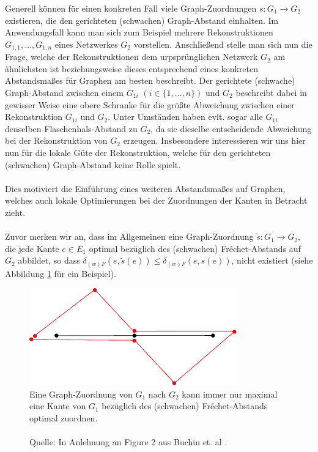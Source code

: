 \documentclass[a4paper, 12pt, twoside]{article}
\theoremstyle{Format1} %
\begin{document}
Generell können für einen konkreten Fall viele Graph-Zuordnungen $s: G_1 \to G_2$ existieren, die den gerichteten (schwachen) Graph-Abstand einhalten.
Im Anwendungsfall kann man sich zum Beispiel mehrere Rekonstruktionen $G_{1,1}, ..., G_{1,n}$ eines Netzwerkes $G_2$ vorstellen.
Anschließend stelle man sich nun die Frage, welche der Rekonstruktionen dem urpsprünglichen Netzwerk $G_2$ am ähnlichsten ist beziehungsweise dieses entsprechend eines konkreten Abstandsmaßes
für Graphen am besten beschreibt.
Der gerichtete (schwache) Graph-Abstand zwischen einem $G_{1i}$ $(i \in \{1,...,n\})$ und $G_2$ beschreibt dabei in gewisser Weise eine obere Schranke für die größte Abweichung zwischen
einer Rekonstruktion $G_{1i}$ und $G_2$.
Unter Umständen haben evlt. sogar alle $G_{1i}$ denselben Flaschenhals-Abstand zu $G_2$, da sie dieselbe entscheidende Abweichung bei der Rekonstruktion von $G_2$ erzeugen.
Insbesondere interessieren wir uns hier nun für die lokale Güte der Rekonstruktion, welche für den gerichteten (schwachen) Graph-Abstand keine Rolle spielt.
\\
\\
Dies motiviert die Einführung eines weiteren Abstandsmaßes auf Graphen, welches auch lokale Optimierungen bei der Zuordnungen der Kanten in Betracht zieht.
\\
\\
Zuvor merken wir an, dass im Allgemeinen eine Graph-Zuordnung $\tilde{s}: G_1 \to G_2$, die jede Kante $e \in E_1$ optimal bezüglich des (schwachen)
Fréchet-Abstands auf $G_2$ abbildet, so dass $\delta_{(w)F}(e, \tilde{s}(e)) \leq \delta_{(w)F}(e, s(e))$, nicht existiert (siehe Abbildung \ref{chapter_2_example_0} für ein Beispiel).

\begin{figure}[H]
    \centering
    \includegraphics[width=0.8\textwidth]{chapter_2_example_0.pdf}
	\caption{Eine Graph-Zuordnung von $G_1$ nach $G_2$ kann immer nur maximal eine Kante von $G_1$ bezüglich des (schwachen) Fréchet-Abstands optimal zuordnen.
	\\
	\\
	Quelle: In Anlehnung an Figure 2 aus Buchin et. al \cite{Buchin}.
	}
    \label{chapter_2_example_0}
\end{figure}
\end{document}
